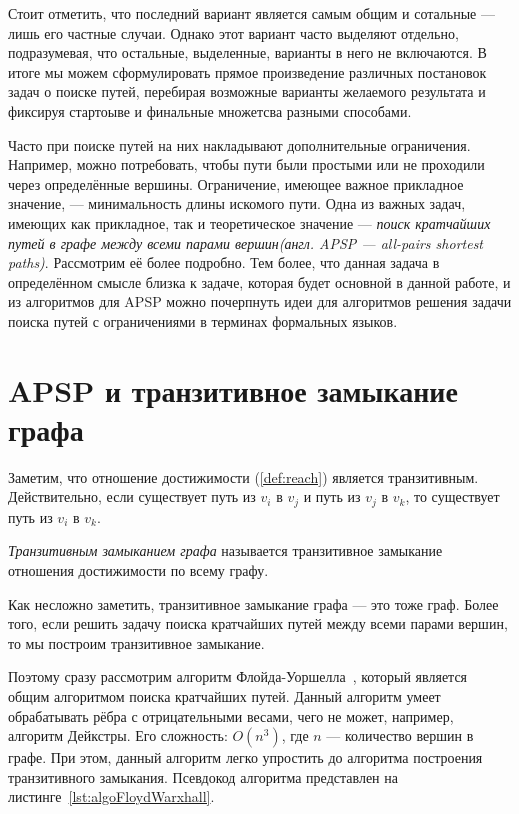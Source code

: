 Стоит отметить, что последний вариант является самым общим и сотальные --- лишь его частные случаи. 
Однако этот вариант часто выделяют отдельно, подразумевая, что остальные, выделенные, варианты в него не включаются. В итоге мы можем сформулировать прямое произведение различных постановок задач о поиске путей, перебирая возможные варианты желаемого результата и фиксируя стартоыве и финальные множетсва разными способами.

Часто при поиске путей на них накладывают дополнительные ограничения. Например, можно потребовать, чтобы пути были простыми или не проходили через определённые вершины.
Ограничение, имеющее важное прикладное значение, --- минимальность длины искомого пути.
Одна из важных задач, имеющих как прикладное, так и теоретическое значение --- \textit{поиск кратчайших путей в графе между всеми парами вершин(англ. APSP --- all-pairs shortest paths)}. Рассмотрим её более подробно. Тем более, что данная задача в определённом смысле близка к задаче, которая будет основной в данной работе, и из алгоритмов для APSP можно почерпнуть идеи для алгоритмов решения задачи поиска путей с ограничениями в терминах формальных языков.


\section{APSP и транзитивное замыкание графа}

Заметим, что отношение достижимости (\ref{def:reach}) является транзитивным.
Действительно, если существует путь из $v_i$ в $v_j$ и путь из $v_j$ в $v_k$, то существует путь из $v_i$ в $v_k$.

\begin{definition}
  \textit{Транзитивным замыканием графа} называется транзитивное замыкание отношения достижимости по всему графу.
\end{definition}

Как несложно заметить, транзитивное замыкание графа --- это тоже граф.
Более того, если решить задачу поиска кратчайших путей между всеми парами вершин, то мы построим транзитивное замыкание.

Поэтому сразу рассмотрим алгоритм Флойда-Уоршелла~\cite{Floyd1962, Bernard1959, Warshall1962}, который является общим алгоритмом поиска кратчайших путей. Данный алгоритм умеет обрабатывать рёбра с отрицательными весами, чего не может, например, алгоритм Дейкстры. Его сложность: $O(n^3)$, где $n$ --- количество вершин в графе. При этом, данный алгоритм легко упростить до алгоритма построения транзитивного замыкания. Псевдокод алгоритма представлен на листинге~\ref{lst:algoFloydWarxhall}.


